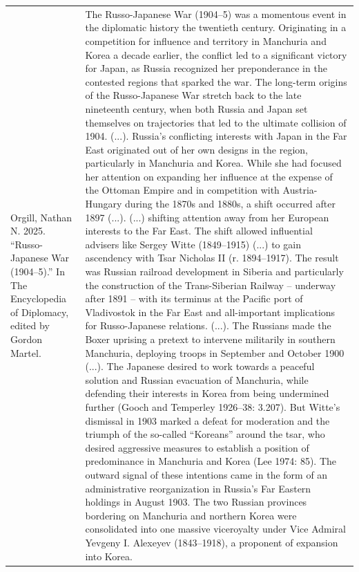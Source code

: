 {\begin{longtable}{p{}p{}}
Orgill, Nathan N. 2025. “Russo-Japanese War (1904–5).” In The Encyclopedia of Diplomacy, edited by Gordon Martel. & The Russo-Japanese War (1904–5) was a momentous event in the diplomatic history the twentieth century. Originating in a competition for influence and territory in Manchuria and Korea a decade earlier, the conflict led to a significant victory for Japan, as Russia recognized her preponderance in the contested regions that sparked the war. The long-term origins of the Russo-Japanese War stretch back to the late nineteenth century, when both Russia and Japan set themselves on trajectories that led to the ultimate collision of 1904. (...). Russia's conflicting interests with Japan in the Far East originated out of her own designs in the region, particularly in Manchuria and Korea. While she had focused her attention on expanding her influence at the expense of the Ottoman Empire and in competition with Austria-Hungary during the 1870s and 1880s, a shift occurred after 1897 (...). (...) shifting attention away from her European interests to the Far East. The shift allowed influential advisers like Sergey Witte (1849–1915) (...) to gain ascendency with Tsar Nicholas II (r. 1894–1917). The result was Russian railroad development in Siberia and particularly the construction of the Trans-Siberian Railway – underway after 1891 – with its terminus at the Pacific port of Vladivostok in the Far East and all-important implications for Russo-Japanese relations. (...). The Russians made the Boxer uprising a pretext to intervene militarily in southern Manchuria, deploying troops in September and October 1900 (...). The Japanese desired to work towards a peaceful solution and Russian evacuation of Manchuria, while defending their interests in Korea from being undermined further (Gooch and Temperley 1926–38: 3.207). But Witte's dismissal in 1903 marked a defeat for moderation and the triumph of the so-called “Koreans” around the tsar, who desired aggressive measures to establish a position of predominance in Manchuria and Korea (Lee 1974: 85). The outward signal of these intentions came in the form of an administrative reorganization in Russia's Far Eastern holdings in August 1903. The two Russian provinces bordering on Manchuria and northern Korea were consolidated into one massive viceroyalty under Vice Admiral Yevgeny I. Alexeyev (1843–1918), a proponent of expansion into Korea.



\end{longtable}}
